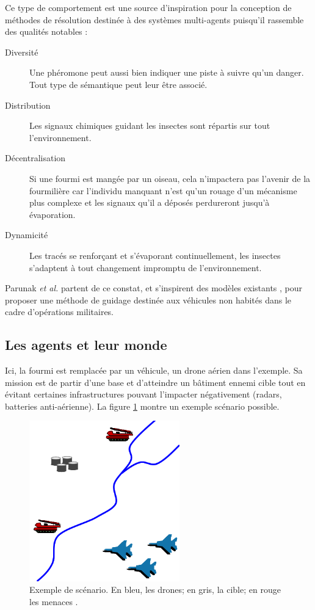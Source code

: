 \documentclass[12pt]{article}
\begin{document}
Ce type de comportement est une source d'inspiration pour la
conception de méthodes de résolution destinée à des systèmes
multi-agents puisqu'il rassemble des qualités notables \cite{dorigo}
:

\begin{description}
\item[Diversité]{Une phéromone peut aussi bien indiquer une piste à
  suivre qu'un danger. Tout type de sémantique peut leur être
  associé.}
\item[Distribution]{Les signaux chimiques guidant les insectes sont
  répartis sur tout l'environnement.}
\item[Décentralisation]{Si une fourmi est mangée par un oiseau, cela
  n'impactera pas l'avenir de la fourmilière car l'individu manquant
  n'est qu'un rouage d'un mécanisme plus complexe et les signaux qu'il
  a déposés perdureront jusqu'à évaporation.}
\item[Dynamicité]{Les tracés se renforçant et s'évaporant
  continuellement, les insectes s'adaptent à tout changement impromptu
  de l'environnement.}
\end{description}

Parunak \textit{et al.} partent de ce constat, et s'inspirent des
modèles existants \cite{swarm}, pour proposer une méthode de guidage
destinée aux véhicules non habités dans le cadre d'opérations
militaires.

\subsection{Les agents et leur monde}

Ici, la fourmi est remplacée par un véhicule, un drone aérien dans
l'exemple. Sa mission est de partir d'une base et d'atteindre un
bâtiment ennemi cible tout en évitant certaines infrastructures
pouvant l'impacter négativement (radars, batteries anti-aérienne). La
figure \ref{real} montre un exemple scénario possible.

\begin{figure}[H]
  \centering

  \includegraphics[width=6.5cm]{terrain_real.png}

  \caption{Exemple de scénario. En bleu, les drones; en gris, la
    cible; en rouge les menaces \cite{parunak}.}
  \label{real}
\end{figure}
\end{document}
